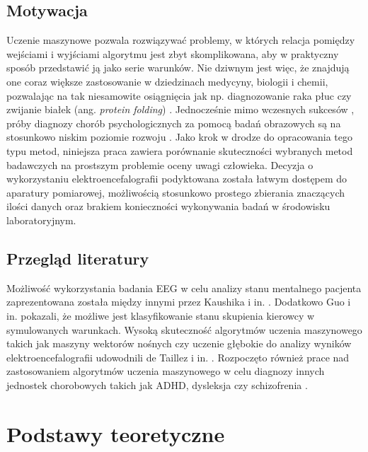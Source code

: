 \documentclass{./assets/wfis}
\begin{document}
\section{Motywacja}
Uczenie maszynowe pozwala rozwiązywać problemy, w których relacja pomiędzy wejściami i wyjściami algorytmu jest zbyt skomplikowana, aby w praktyczny sposób przedstawić ją jako serie warunków. Nie dziwnym jest więc, że znajdują one coraz większe zastosowanie w dziedzinach medycyny, biologii i chemii, pozwalając na tak niesamowite osiągnięcia jak np. diagnozowanie raka płuc \cite{li_machine_2022} czy zwijanie białek (ang. \textit{protein folding}) \cite{jumper_highly_2021}. Jednocześnie mimo wczesnych sukcesów \cite{some comparasion}, próby diagnozy chorób psychologicznych za pomocą badań obrazowych są na stosunkowo niskim poziomie rozwoju \cite{badania adhd i podobne}. Jako krok w drodze do opracowania tego typu metod, niniejsza praca zawiera porównanie skuteczności wybranych metod badawczych na prostszym problemie oceny uwagi człowieka. Decyzja o wykorzystaniu elektroencefalografii podyktowana została łatwym dostępem do aparatury pomiarowej, możliwością stosunkowo prostego zbierania znaczących ilości danych oraz brakiem konieczności wykonywania badań w środowisku laboratoryjnym.

\section{Przegląd literatury}
Możliwość wykorzystania badania EEG w celu analizy stanu mentalnego pacjenta zaprezentowana została między innymi przez Kaushika i in. \cite{kaushik_decoding_2022}. Dodatkowo Guo i in. \cite{guo_detection_2018} pokazali, że możliwe jest klasyfikowanie stanu skupienia kierowcy w symulowanych warunkach. Wysoką skuteczność algorytmów uczenia maszynowego takich jak maszyny wektorów nośnych czy uczenie głębokie do analizy wyników elektroencefalografii udowodnili de Taillez i in. \cite{de_taillez_machine_2020}. Rozpoczęto również prace nad zastosowaniem algorytmów uczenia maszynowego w celu diagnozy innych jednostek chorobowych takich jak ADHD, dysleksja czy schizofrenia \cite{ahire_comprehensive_2022, joshi_review_2021, clarke_eeg_2002}.

\chapter{Podstawy teoretyczne}
\end{document}
